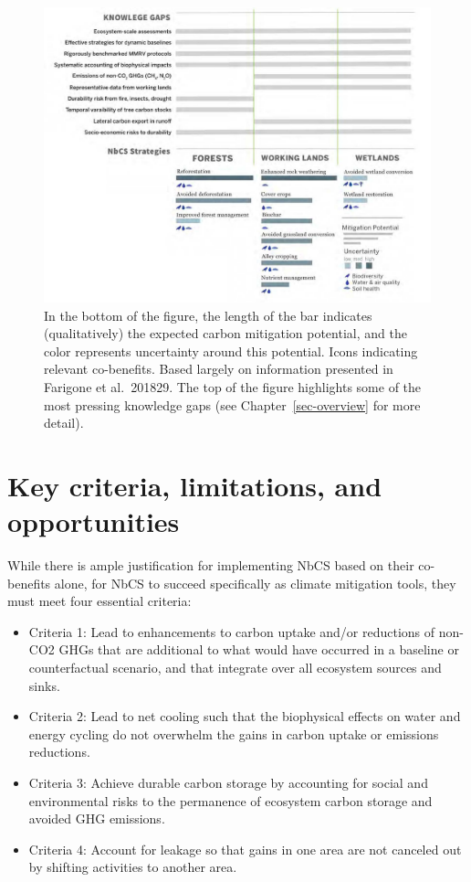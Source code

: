 \documentclass[
  letterpaper,
  DIV=11,
  numbers=noendperiod]{scrreprt}
\providecommand{\tightlist}{%
  \setlength{\itemsep}{0pt}\setlength{\parskip}{0pt}}\usepackage{longtable,booktabs,array}
\begin{document}
\begin{figure}

{\centering \includegraphics{img/01-nature-climate-solutions.jpg}

}

\caption{\label{fig-terrestrial-nature-solutions}In the bottom of the
figure, the length of the bar indicates (qualitatively) the expected
carbon mitigation potential, and the color represents uncertainty around
this potential. Icons indicating relevant co-benefits. Based largely on
information presented in Farigone et al.~201829. The top of the figure
highlights some of the most pressing knowledge gaps (see
Chapter~\ref{sec-overview} for more detail).}

\end{figure}

\hypertarget{sec-criteria}{%
\section{Key criteria, limitations, and
opportunities}\label{sec-criteria}}

While there is ample justification for implementing NbCS based on their
co-benefits alone, for NbCS to succeed specifically as climate
mitigation tools, they must meet four essential criteria:

\begin{itemize}
\tightlist
\item
  Criteria 1: Lead to enhancements to carbon uptake and/or reductions of
  non-CO2 GHGs that are additional to what would have occurred in a
  baseline or counterfactual scenario, and that integrate over all
  ecosystem sources and sinks.
\item
  Criteria 2: Lead to net cooling such that the biophysical effects on
  water and energy cycling do not overwhelm the gains in carbon uptake
  or emissions reductions.
\item
  Criteria 3: Achieve durable carbon storage by accounting for social
  and environmental risks to the permanence of ecosystem carbon storage
  and avoided GHG emissions.
\item
  Criteria 4: Account for leakage so that gains in one area are not
  canceled out by shifting activities to another area.
\end{itemize}
\end{document}
